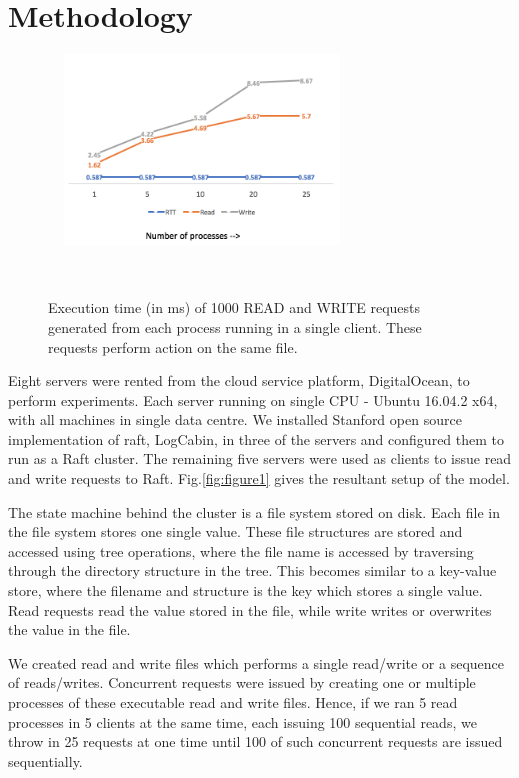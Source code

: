 \section{Methodology}

\begin{figure}
\centering
\includegraphics[height=2in, width=3.2in]{images/F_OneClient.png}
\caption{Execution time (in ms) of 1000 READ and WRITE requests generated from each process running in a single client. These requests perform action on the same file.}~\label{fig:figure2}
\end{figure}


Eight servers were rented from the cloud service platform, DigitalOcean, to perform experiments. Each server running on single CPU - Ubuntu 16.04.2 x64, with all machines in single data centre. We installed Stanford open source implementation of raft, LogCabin, in three of the servers and configured them to run as a Raft cluster. The remaining five servers were used as clients to issue read and write requests to Raft. Fig.\ref{fig:figure1} gives the resultant setup of the model.

The state machine behind the cluster is a file system stored on disk. Each file in the file system stores one single value. These file structures are stored and accessed using tree operations, where the file name is accessed by traversing through the directory structure in the tree. This becomes similar to a key-value store, where the filename and structure is the key which stores a single value. Read requests read the value stored in the file, while write writes or overwrites the value in the file. 

We created read and write files which performs a single read/write or a sequence of reads/writes. Concurrent requests were issued by creating one or multiple processes of these executable read and write files. Hence, if we ran 5 read processes in 5 clients at the same time, each issuing 100 sequential reads, we throw in 25 requests at one time until 100 of such concurrent requests are issued sequentially.



 

